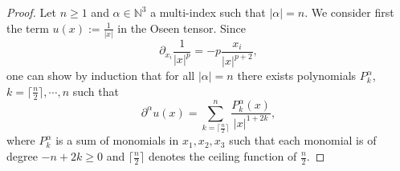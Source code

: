 \documentclass[10pt]{amsart}
\theoremstyle{definition}\newtheorem{defi}[theo]{Definition}\newtheorem{rema}[theo]{Remark}\newtheorem{exam}[theo]{Example}\newtheorem{exem}[theo]{Example}\newtheorem{nota}[theo]{Notation}
\newcommand{\N}{\mathbb{N}}
\renewcommand{\geq}{\geqslant}
\begin{document}
\begin{proof}
Let $n\geq 1$ and $\alpha \in \N^3$ a multi-index such that $|\alpha|=n $. We consider first the term $u(x):=\frac{1}{|x|}$ in the Oseen tensor. Since
\begin{equation}\label{marre}
\partial_{x_i} \frac{1}{|x|^p}=-p \frac{x_i}{|x|^{p+2}},
\end{equation}
one can show by induction that for all $|\alpha|=n$ there exists polynomials $P_k^\alpha$, $k=\lceil\frac{n}{2}\rceil,\cdots, n$ such that
\begin{equation}\label{eq:reccurence}
\partial^\alpha u(x)=\underset{k=\lceil \frac{n}{2}\rceil }{\overset{n}{\sum}} \frac{P_k^\alpha(x)}{|x|^{1+2k}},
\end{equation}
where $P_k^\alpha$ is a sum of monomials in $x_1,x_2,x_3$ such that each monomial is of degree $ -n+2k \geq 0 $ and $\lceil \frac{n}{2}\rceil$ denotes the ceiling function of $\frac{n}{2}$.


\end{proof}
\end{document}

